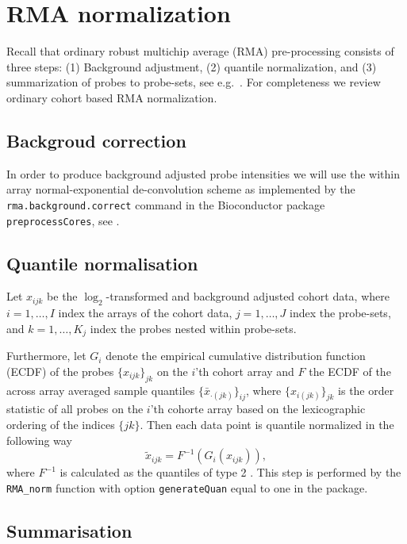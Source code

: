 \documentclass{article}
\begin{document}
\section{RMA normalization}
Recall that ordinary robust multichip average (RMA) pre-processing consists of three steps: (1) Background adjustment, (2) quantile normalization, and (3) summarization of probes to probe-sets, see e.g.\ \citep{Irizarry2003, Irizarry2003b}. For completeness we review ordinary cohort based RMA normalization.

\subsection{Backgroud correction}
In order to produce background adjusted probe intensities we will use the within array normal-exponential de-convolution scheme as implemented by the \texttt{rma.background.correct} command in the Bioconductor package \texttt{preprocessCores}, see
\citep{Irizarry2003b,Bolstad2004}.


\subsection{Quantile normalisation}
Let $x_{ijk}$ be the $\log_2$-transformed and background adjusted cohort data, where $i = 1,\dots,I$ index the arrays of the cohort data, $j=1,\dots,J$  index the probe-sets, and $k=1,\dots,K_j$ index the probes nested within probe-sets.

Furthermore, let $G_i$ denote the empirical cumulative distribution function (ECDF) of the probes $\{x_{ijk}\}_{jk}$ on the $i$'th cohort array and $F$ the ECDF of the across array averaged sample quantiles $\{\bar{x}_{\cdot (jk)}\}_{ij}$, where $\{x_{i(jk)}\}_{jk}$ is the order statistic of all probes on the $i$'th cohorte array based on the lexicographic ordering of the indices $\{jk\}$. Then each data point is quantile normalized in the following way
\begin{equation*}
     \tilde{x}_{ijk} = F^{-1}(G_i(x_{ijk})),
\end{equation*}
where $F^{-1}$ is calculated as the quantiles of type 2 \citep{Hyndman1996}.
This step is performed by the \texttt{RMA\_norm} function with option \texttt{generateQuan} equal to one in the \hemaClass{} package.

\subsection{Summarisation}
\end{document}
